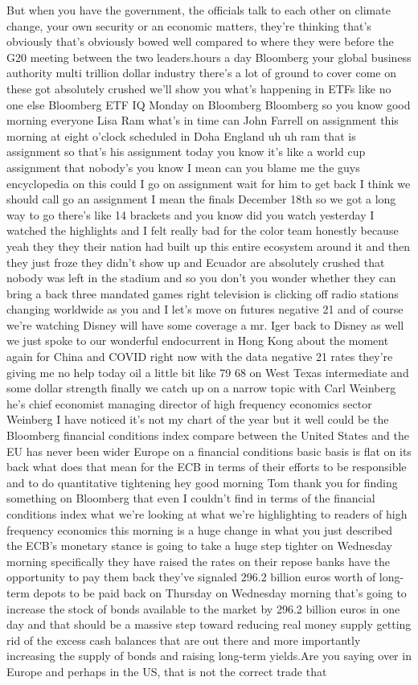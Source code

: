 \documentclass{article}%
\begin{document}
But when you have the government, the officials talk to each other on climate change, your own security or an economic matters, they're thinking that's obviously that's obviously bowed well compared to where they were before the G20 meeting between the two leaders.hours a day Bloomberg your global business authority multi trillion dollar industry there's a lot of ground to cover come on these got absolutely crushed we'll show you what's happening in ETFs like no one else Bloomberg ETF IQ Monday on Bloomberg Bloomberg so you know good morning everyone Lisa Ram what's in time can John Farrell on assignment this morning at eight o'clock scheduled in Doha England uh uh ram that is assignment so that's his assignment today you know it's like a world cup assignment that nobody's you know I mean can you blame me the guys encyclopedia on this could I go on assignment wait for him to get back I think we should call go an assignment I mean the finals December 18th so we got a long way to go there's like 14 brackets and you know did you watch yesterday I watched the highlights and I felt really bad for the color team honestly because yeah they they their nation had built up this entire ecosystem around it and then they just froze they didn't show up and Ecuador are absolutely crushed that nobody was left in the stadium and so you don't you wonder whether they can bring a back three mandated games right television is clicking off radio stations changing worldwide as you and I let's move on futures negative 21 and of course we're watching Disney will have some coverage a mr. Iger back to Disney as well we just spoke to our wonderful endocurrent in Hong Kong about the moment again for China and COVID right now with the data negative 21 rates they're giving me no help today oil a little bit like 79 68 on West Texas intermediate and some dollar strength finally we catch up on a narrow topic with Carl Weinberg he's chief economist managing director of high frequency economics sector Weinberg I have noticed it's not my chart of the year but it well could be the Bloomberg financial conditions index compare between the United States and the EU has never been wider Europe on a financial conditions basic basis is flat on its back what does that mean for the ECB in terms of their efforts to be responsible and to do quantitative tightening hey good morning Tom thank you for finding something on Bloomberg that even I couldn't find in terms of the financial conditions index what we're looking at what we're highlighting to readers of high frequency economics this morning is a huge change in what you just described the ECB's monetary stance is going to take a huge step tighter on Wednesday morning specifically they have raised the rates on their repose banks have the opportunity to pay them back they've signaled 296.2 billion euros worth of long{-}term depots to be paid back on Thursday on Wednesday morning that's going to increase the stock of bonds available to the market by 296.2 billion euros in one day and that should be a massive step toward reducing real money supply getting rid of the excess cash balances that are out there and more importantly increasing the supply of bonds and raising long{-}term yields.Are you saying over in Europe and perhaps in the US, that is not the correct trade that 
\end{document}
